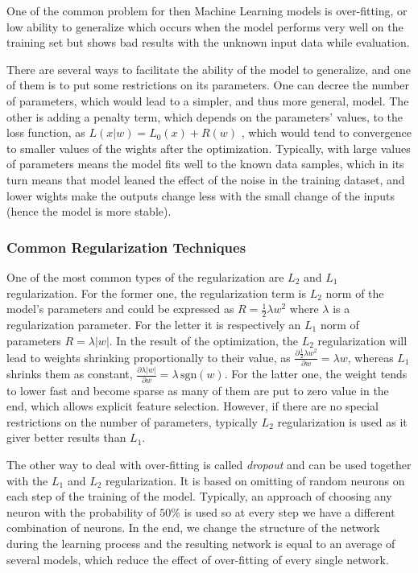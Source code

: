 One of the common problem for then Machine Learning models is over-fitting, or low ability to generalize which occurs when the model performs very well on the training set but shows bad results with the unknown input data while evaluation.
\medskip

There are several ways to facilitate the ability of the model to generalize, and one of them is to put some restrictions on its parameters.
One can decree the number of parameters, which would lead to a simpler, and thus more general, model.
The other is adding a penalty term, which depends on the parameters' values, to the loss function, as $L(x|w) = L_{0}(x) + R(w)$ , which would tend to convergence to smaller values of the wights after the optimization. 
Typically, with large values of parameters means the model fits well to the known data samples, which in its turn means that model leaned the effect of the noise in the training dataset, and lower wights make the outputs change less with the small change of the inputs (hence the model is more stable).
\medskip

\subsubsection{Common Regularization Techniques}

One of the most common types of the regularization are $L_{2}$ and $L_{1}$ regularization.
For the former one, the regularization term is $L_{2}$ norm of the model's parameters and could be expressed as $R=\frac{1}{2}\lambda w^{2}$ where $\lambda$ is a regularization parameter.
For the letter it is respectively an $L_{1}$ norm of parameters $R=\lambda |w|$.
In the result of the optimization, the $L_{2}$ regularization will lead to weights shrinking proportionally to their value, as $\frac{\partial \frac{1}{2} \lambda w^{2} }{\partial w} = \lambda w$, whereas $L_{1}$ shrinks them as constant, $\frac{\partial \lambda |w| }{\partial w} = \lambda \, \mathrm{sgn}(w) $.
For the latter one, the weight tends to lower fast and become sparse as many of them are put to zero value in the end, which allows explicit feature selection.
However, if there are no special restrictions on the number of parameters, typically $L_{2}$ regularization is used as it giver better results than $L_{1}$.
\medskip

The other way to deal with over-fitting is called \textit{dropout} and can be used together with the $L_{1}$ and $L_{2}$ regularization.
It is based on omitting of random neurons on each step of the training of the model.
Typically, an approach of choosing any neuron with the probability of $50\%$ is used so at every step we have a different combination of neurons.
In the end, we change the structure of the network during the learning process and the resulting network is equal to an average of several models, which reduce the effect of over-fitting of every single network.

